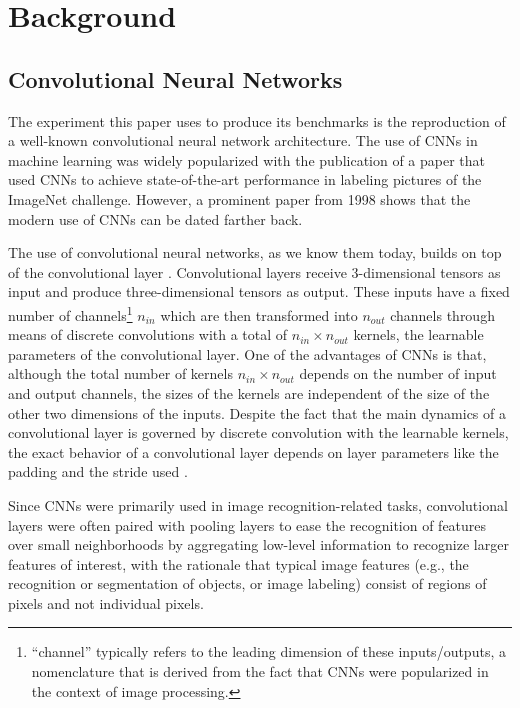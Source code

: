 \documentclass[10pt,twocolumn,english,format=sigplan,screen,balance]{acmart}
\begin{document}
\section{Background}

\subsection{Convolutional Neural Networks}

The experiment this paper uses to produce its benchmarks is the reproduction
of a well-known convolutional neural network architecture. The use
of CNNs in machine learning was widely popularized with the publication
of a paper \citep{cnns-imagenet} that used CNNs to achieve state-of-the-art
performance in labeling pictures of the ImageNet \citep{imagenet}
challenge. However, a prominent paper from 1998 \citep{cnns-lecun-doc-recognition}
shows that the modern use of CNNs can be dated farther back.

The use of convolutional neural networks, as we know them today, builds
on top of the convolutional layer \citep{intro-to-cnn}. Convolutional
layers receive 3-dimensional tensors as input and produce three-dimensional
tensors as output. These inputs have a fixed number of channels\footnote{“channel” typically refers to the leading dimension of these
inputs/outputs, a nomenclature that is derived from the fact that
CNNs were popularized in the context of image processing.} $n_{in}$ which are then transformed into $n_{out}$ channels through
means of discrete convolutions with a total of $n_{in}\times n_{out}$
kernels, the learnable parameters of the convolutional layer. One
of the advantages of CNNs is that, although the total number of kernels
$n_{in}\times n_{out}$ depends on the number of input and output
channels, the sizes of the kernels are independent of the size of
the other two dimensions of the inputs. Despite the fact that the
main dynamics of a convolutional layer is governed by discrete convolution
with the learnable kernels, the exact behavior of a convolutional
layer depends on layer parameters like the padding and the stride
used \citep{conv-arithmetic-guide}.

Since CNNs were primarily used in image recognition-related tasks,
convolutional layers were often paired with pooling layers to ease
the recognition of features over small neighborhoods \citep{pooling}
by aggregating low-level information to recognize larger features
of interest, with the rationale that typical image features (e.g.,
the recognition or segmentation of objects, or image labeling) consist
of regions of pixels and not individual pixels.
\end{document}
